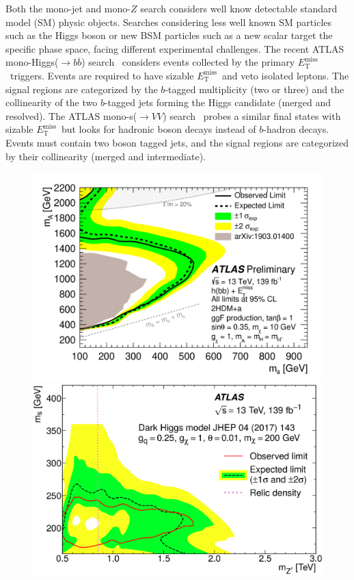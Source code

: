 \documentclass{moriond}
\def\et{E_\textrm{T}^{\textrm{miss}}}
\begin{document}
Both the mono-jet and mono-$Z$ search considers well know detectable standard
model (SM) physic objects. Searches considering less well known SM particles
such as the Higgs boson or new BSM particles such as a new scalar target the
specific phase space, facing different experimental challenges. The recent
ATLAS mono-Higgs($\rightarrow b\overline{b}$) search~\cite{monoh} considers
events collected by the primary $\et$\ triggers. Events are required to have
sizable $\et$\ and veto isolated leptons. The signal regions are categorized by
the $b$-tagged multiplicity (two or three) and the collinearity of the two
$b$-tagged jets forming the Higgs candidate (merged and resolved). The ATLAS
mono-s($\rightarrow VV$) search~\cite{monos} probes a similar final states with
sizable $\et$\ but looks for hadronic boson decays instead of $b$-hadron
decays. Events must contain two boson tagged jets, and the signal regions are
categorized by their collinearity (merged and intermediate).    

\begin{figure} [htb]
\begin{minipage}{0.45\linewidth}
\centerline{\includegraphics[width=0.9\linewidth]{monoh}}
\end{minipage}
\begin{minipage}{0.45\linewidth}
\centerline{\includegraphics[width=0.9\linewidth]{monos}}
\end{minipage}
\caption[]{}
\label{fig:mono_h_s}
\end{figure}
\end{document}
